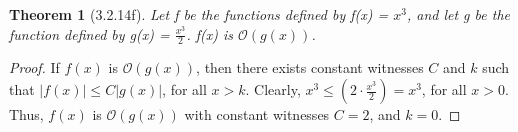 \documentclass[a4paper, 12pt]{article}
\theoremstyle{plain}
\newtheorem*{theorem*}{Theorem}
\begin{document}
	
	\begin{theorem*}[3.2.14f]
		Let f be the functions defined by f(x) = $x^{3}$, and let g be the function defined by g(x) = $\frac{x^{3}}{2}$. f(x) is $\mathcal{O}(g(x))$.
	\end{theorem*}
	
	\begin{proof}
		If $f(x)$ is $\mathcal{O}(g(x))$, then there exists constant witnesses $C$ and $k$ such that $|f(x)| \le C|g(x)|$, for all $x > k$. Clearly, $x^{3} \le \left( 2 \cdot \frac{x^{3}}{2} \right) = x^{3}$, for all $x > 0$. Thus, $f(x)$ is $\mathcal{O}(g(x))$ with constant witnesses $C = 2$, and $k = 0$.
	\end{proof}
\end{document}
